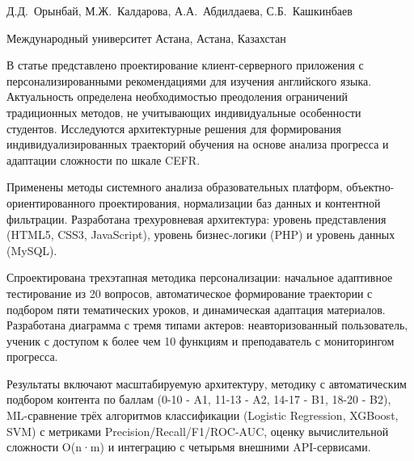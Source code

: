 
\begin{header}

Д.Д.~Орынбай,
М.Ж.~Калдарова\envelope,
А.А.~Абдилдаева,
С.Б.~Кашкинбаев
\end{header}

\begin{affil}
Международный университет Астана, Астана, Казахстан

\end{affil}

В статье представлено проектирование клиент-серверного приложения с
персонализированными рекомендациями для изучения английского языка.
Актуальность определена необходимостью преодоления ограничений
традиционных методов, не учитывающих индивидуальные особенности
студентов. Исследуются архитектурные решения для формирования
индивидуализированных траекторий обучения на основе анализа прогресса и
адаптации сложности по шкале CEFR.

Применены методы системного анализа образовательных платформ,
объектно-ориентированного проектирования, нормализации баз данных и
контентной фильтрации. Разработана трехуровневая архитектура: уровень
представления (HTML5, CSS3, JavaScript), уровень бизнес-логики (PHP) и
уровень данных (MySQL).

Спроектирована трехэтапная методика персонализации: начальное адаптивное
тестирование из 20 вопросов, автоматическое формирование траектории с
подбором пяти тематических уроков, и динамическая адаптация материалов.
Разработана диаграмма с тремя типами актеров: неавторизованный
пользователь, ученик с доступом к более чем 10 функциям и преподаватель
с мониторингом прогресса.

Результаты включают масштабируемую архитектуру, методику с
автоматическим подбором контента по баллам (0-10 - A1, 11-13 - A2, 14-17
- B1, 18-20 - B2), ML-сравнение трёх алгоритмов классификации (Logistic
Regression, XGBoost, SVM) с метриками Precision/Recall/F1/ROC-AUC,
оценку вычислительной сложности O(n·m) и интеграцию с четырьмя внешними
API-сервисами.

